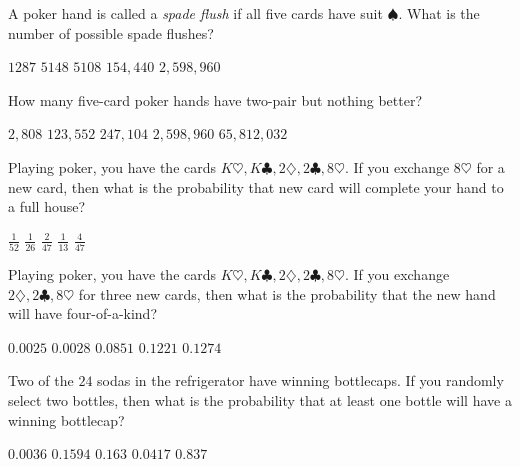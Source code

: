 \documentclass[answers,12pt]{exam}
\begin{document}
\begin{questions}
\question A poker hand is called a {\em spade flush}
if all five cards have suit $\spadesuit$. What is
the number of possible spade flushes?\\
\begin{oneparchoices}
\correctchoice $1287$
\choice $5148$ %
\choice $5108$ %
\choice $154,440$ %
\choice $2,598,960$ %
\end{oneparchoices}

\question 
How many five-card poker hands have two-pair but nothing better?\\
\begin{oneparchoices}
\choice $2,808$ %
\correctchoice $123,552$
\choice $247,104$ %
\choice $2,598,960$ %
\choice $65,812,032$ %
\end{oneparchoices}

\question Playing poker, you have the cards
$K\heartsuit,K\clubsuit,2\diamondsuit,2\clubsuit,8\heartsuit$.
If you exchange $8\heartsuit$ for a new card,
then what is the probability that new card
will complete your hand to a full house?\\
\begin{oneparchoices}
\choice $\frac{1}{52}$
\choice $\frac{1}{26}$ %
\choice $\frac{2}{47}$ %
\choice $\frac{1}{13}$ %
\correctchoice $\frac{4}{47}$
\end{oneparchoices}

\question Playing poker, you have the cards
$K\heartsuit,K\clubsuit,2\diamondsuit,2\clubsuit,8\heartsuit$.
If you exchange $2\diamondsuit,2\clubsuit,8\heartsuit$ for three
new cards, then what is the probability that the new hand
will have four-of-a-kind?\\
\begin{oneparchoices}
\choice $0.0025$ %
\correctchoice $0.0028$
\choice $0.0851$ %
\choice $0.1221$ %
\choice $0.1274$ %
\end{oneparchoices}

\question Two of the $24$ sodas in the refrigerator
have winning bottlecaps. If you randomly select two
bottles, then what is the probability that at least one bottle
will have a winning bottlecap?\\
\begin{oneparchoices}
\choice $0.0036$ %
\choice $0.1594$ %
\correctchoice $0.163$
\choice $0.0417$ %
\choice $0.837$ %
\end{oneparchoices}

\end{questions}
\end{document}
